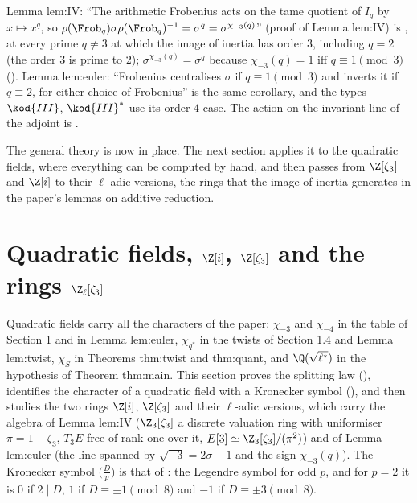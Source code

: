 \begin{paperlink}\label{pl:ant:frobsigma}
Lemma lem:IV: ``The arithmetic Frobenius acts on the tame quotient of $I_q$ by $x\mapsto x^q$, so $\rho(\Frob_q)\sigma\rho(\Frob_q)^{-1}=\sigma^q=\sigma^{\chi_{-3}(q)}$''
(proof of Lemma lem:IV) is , at every prime $q\ne3$ at which the image of inertia has order $3$, including $q=2$ (the order $3$ is
prime to $2$); $\sigma^{\chi_{-3}(q)}=\sigma^q$ because $\chi_{-3}(q)=1$ iff $q\equiv1\pmod3$ (). Lemma lem:euler: ``Frobenius
centralises $\sigma$ if $q\equiv1\pmod3$ and inverts it if $q\equiv2$, for either choice of Frobenius'' is the same corollary, and the types
$\kod{III}$, $\kod{III}^*$ use its order-$4$ case. The action on the invariant line of the adjoint is .
\end{paperlink}

The general theory is now in place. The next section applies it to the quadratic fields, where everything can be computed by hand, and then passes
from $\Z[\zeta_3]$ and $\Z[i]$ to their $\ell$-adic versions, the rings that the image of inertia generates in the paper's lemmas on additive reduction.

\section{Quadratic fields, \texorpdfstring{$\Z[i]$}{Z[i]}, \texorpdfstring{$\Z[\zeta_3]$}{Z[zeta3]} and the rings \texorpdfstring{$\Z_\ell[\zeta_3]$}{Zl[zeta3]}}\label{sec:ant:quadratic}

Quadratic fields carry all the characters of the paper: $\chi_{-3}$ and $\chi_{-4}$ in the table of Section 1 and in Lemma lem:euler,
$\chi_{q^*}$ in the twists of Section 1.4 and Lemma lem:twist, $\chi_S$ in Theorems thm:twist and thm:quant, and $\Q(\sqrt{\ell^*})$ in the hypothesis
of Theorem thm:main. This section proves the splitting law (), identifies the character of a quadratic field with a
Kronecker symbol (), and then studies the two rings $\Z[i]$, $\Z[\zeta_3]$ and their $\ell$-adic versions, which carry the
algebra of Lemma lem:IV ($\Z_3[\zeta_3]$ a discrete valuation ring with uniformiser $\pi=1-\zeta_3$, $T_3E$ free of rank one over it,
$E[3]\simeq\Z_3[\zeta_3]/(\pi^2)$) and of Lemma lem:euler (the line spanned by $\sqrt{-3}=2\sigma+1$ and the sign $\chi_{-3}(q)$). The Kronecker symbol
$\bigl(\frac Dp\bigr)$ is that of : the Legendre symbol for odd $p$, and for $p=2$ it is $0$ if $2\mid D$, $1$ if $D\equiv\pm1\pmod8$ and $-1$ if
$D\equiv\pm3\pmod8$.

